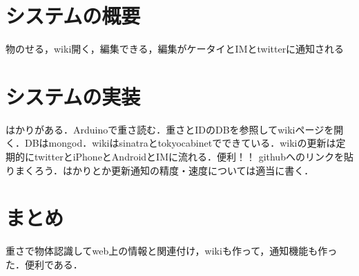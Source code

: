 \section{システムの概要}
物のせる，wiki開く，編集できる，編集がケータイとIMとtwitterに通知される

\section{システムの実装}
はかりがある．Arduinoで重さ読む．重さとIDのDBを参照してwikiページを開く．DBはmongod．wikiはsinatraとtokyocabinetでできている．wikiの更新は定期的にtwitterとiPhoneとAndroidとIMに流れる．便利！！
githubへのリンクを貼りまくろう．はかりとか更新通知の精度・速度については適当に書く．

\section{まとめ}
重さで物体認識してweb上の情報と関連付け，wikiも作って，通知機能も作った．便利である．
